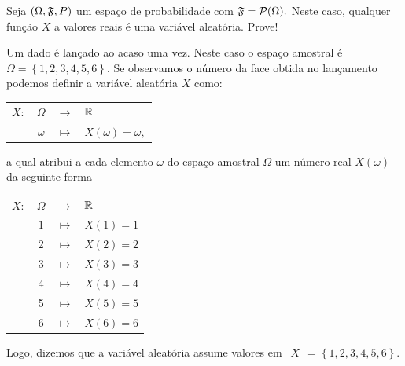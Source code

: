 \begin{frame}


\begin{exem}
	Seja $(\Omega ,\frak{F} ,P)$ um espaço de probabilidade com $\frak{F} ={\cal P} (\Omega ). $ Neste caso, qualquer função $X$ a valores reais é uma variável aleatória. Prove!
\end{exem}

\begin{exem}
	Um dado é lançado ao acaso uma vez. Neste caso o espaço amostral é $\Omega
	=\left\{ 1,2,3,4,5,6\right\} $. Se observamos o  número da face obtida no lançamento podemos definir  a variável aleatória $X$ como:
	\begin{center}
		\begin{tabular}{cccl}
			$X:$ & $\Omega $ & $\rightarrow $ & $\Bbb{R}$ \\
			& $\omega$ & $\mapsto $ & $X\left( \omega\right) =\omega,$ \\ 
		\end{tabular}
	\end{center}
	a qual atribui a cada elemento $\omega$ do espaço amostral $\Omega $ um 
	número real $X\left( \omega\right) $ da seguinte forma
	\begin{center}
		\begin{tabular}{cccl}
			$X:$ & $\Omega $ & $\rightarrow $ & $\Bbb{R}$ \\
			& $1$ & $\mapsto $ & $X\left( 1\right) =1$ \\
			& 2 & $\mapsto $ & $X\left( 2\right) =2$ \\
			& 3 & $\mapsto $ & $X\left( 3\right) =3$ \\
			& 4 & $\mapsto $ & $X\left( 4\right) =4$ \\
			& 5 & $\mapsto $ & $X\left( 5\right) =5$ \\
			& 6 & $\mapsto $ & $X\left( 6\right) =6$%
		\end{tabular}
	\end{center}
	Logo, dizemos que a variável aleatória assume valores em $\ \ X\ \ =\left\{1,2,3,4,5,6\right\}.$
\end{exem}

%  
\end{frame}
%


